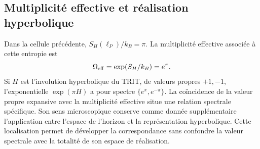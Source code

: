 \subsection{Multiplicité effective et réalisation hyperbolique}

Dans la cellule précédente, \(S_H(\ell_P)/k_B=\pi\). La multiplicité
effective associée à cette entropie est
\[
 \Omega_{\rm eff}=\exp(S_H/k_B)=e^\pi.
\]
Si \(H\) est l’involution hyperbolique du TRIT, de valeurs propres
\(+1,-1\), l’exponentielle \(\exp(\pi H)\) a pour spectre
\(\{e^\pi,e^{-\pi}\}\). La coïncidence de la valeur propre expansive
avec la multiplicité effective situe une relation spectrale spécifique.
Son sens microscopique conserve comme donnée supplémentaire l’application entre
l’espace de l’horizon et la représentation hyperbolique. Cette
localisation permet de développer la correspondance sans confondre
la valeur spectrale avec la totalité de son espace de réalisation.
